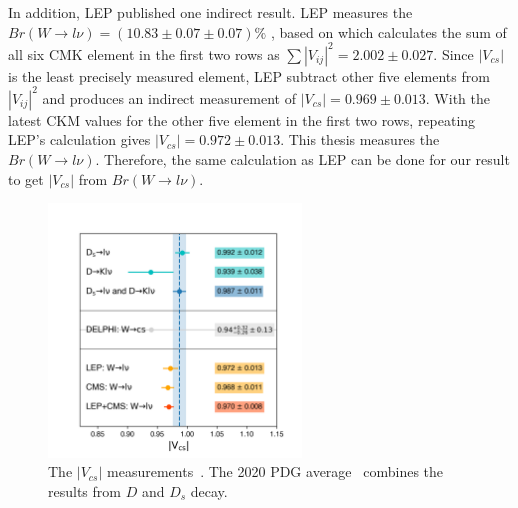 In addition, LEP published one indirect result. LEP measures the $Br(W\to l \nu) = (10.83 \pm 0.07 \pm 0.07) \%$ \cite{Schael:2013ita}, based on which calculates the sum of all six CMK element in the first two rows as $\sum |V_{ij}|^2 = 2.002 \pm 0.027$. Since $|V_{cs}|$ is the least precisely measured element, LEP subtract other five elements from $|V_{ij}|^2 $ and produces an indirect measurement of $|V_{cs}|=0.969\pm 0.013$. With the latest CKM values for the other five element in the first two rows, repeating LEP's calculation gives $|V_{cs}|=0.972\pm 0.013$. This thesis measures the $Br(W\to l \nu)$. Therefore, the same calculation as LEP can be done for our result to get $|V_{cs}|$ from $Br(W\to l \nu)$.


 \begin{figure}
    \centering
    \includegraphics[width=0.6\textwidth]{chapters/RelatedWorks/sectionVcs/figures/vcs_world_average.png}
    \caption{The $|V_{cs}|$ measurements~\cite{pdg2020}. The 2020 PDG average~\cite{pdg2020} combines the results from $D$ and $D_s$ decay.}
    \label{fig:relatedWorks:vcs:measurements}
\end{figure}





% 